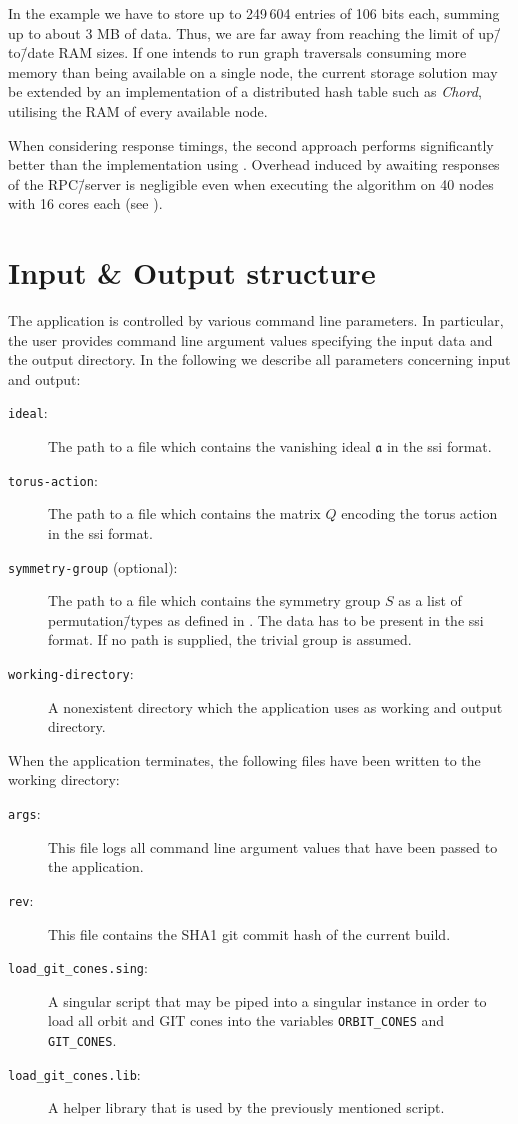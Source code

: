 In the \msix{} example we have to store up to 249\,604 entries of 106 bits each, summing up to about 3 MB of data. Thus, we are far away from reaching the limit of up\=/to\=/date RAM sizes. If one intends to run graph traversals consuming more memory than being available on a single node, the current storage solution may be extended by an implementation of a distributed hash table such as \emph{Chord}, utilising the RAM of every available node. \cite{chord}

When considering response timings, the second approach performs significantly better than the implementation using \beegfs{}. Overhead induced by awaiting responses of the RPC\=/server is negligible even when executing the algorithm on 40 nodes with 16 cores each (see ).

\section{Input \& Output structure}

The application is controlled by various command line parameters. In particular, the user provides command line argument values specifying the input data and the output directory. In the following we describe all parameters concerning input and output:

\begin{description}
	\item[\texttt{ideal}:] The path to a file which contains the vanishing ideal $\mathfrak{a}$ in the \ac{ssi} format.
	\item[\texttt{torus-action}:] The path to a file which contains the matrix $Q$ encoding the torus action in the \ac{ssi} format.
	\item[\texttt{symmetry-group} (optional):] The path to a file which contains the symmetry group $S$ as a list of permutation\=/types as defined in \gitfanlib{}. The data has to be present in the \ac{ssi} format. If no path is supplied, the trivial group is assumed.
	\item[\texttt{working-directory}:] A nonexistent directory which the application uses as working and output directory.
\end{description}

When the application terminates, the following files have been written to the working directory:

\begin{description}
	\item[\texttt{args}:] This file logs all command line argument values that have been passed to the application.
	\item[\texttt{rev}:] This file contains the SHA1 git commit hash of the current build.
	\item[\texttt{load\_git\_cones.sing}:] A singular script that may be piped into a singular instance in order to load all orbit and GIT cones into the variables \texttt{ORBIT\_CONES} and \texttt{GIT\_CONES}.
	\item[\texttt{load\_git\_cones.lib}:] A helper library that is used by the previously mentioned script.
\end{description}

